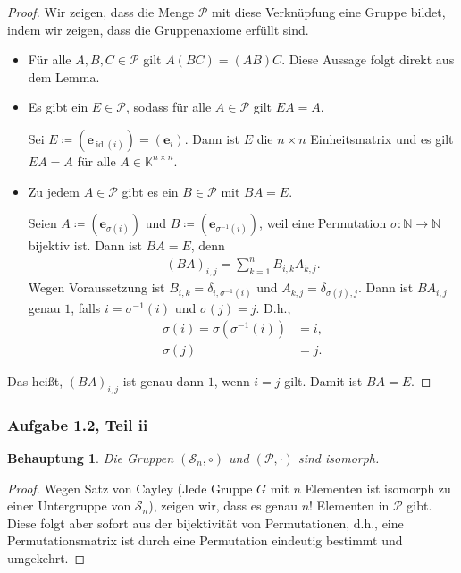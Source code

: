 \documentclass[draft,a5paper]{article}
\newtheorem*{beh}{Behauptung}
\DeclareMathOperator{\id}{id}
\begin{document}
\begin{proof}
  Wir zeigen, dass die Menge \(\mathcal{P} \) mit diese Verknüpfung eine Gruppe
  bildet, indem wir zeigen, dass die Gruppenaxiome erfüllt sind.

  \begin{itemize}
  \item Für alle \(A, B, C \in \mathcal{P} \) gilt \( A(BC) = (AB)C \).  Diese
    Aussage folgt direkt aus dem Lemma.
  \item Es gibt ein \( E \in \mathcal{P} \), sodass für alle \( A \in \mathcal{P} \) gilt \(
    EA = A\).

    Sei \( E \coloneq (\mathbf{e}_{\id (i)}) =
    (\mathbf{e}_{i}) \). Dann ist \(E\) die \(n \times n\)
    Einheitsmatrix und es gilt \(EA=A\) für alle \(A \in \mathbb{K}^{n
    \times n}\).
  \item Zu jedem \( A \in \mathcal{P} \) gibt es ein \( B \in \mathcal{P} \) mit \( B A = E \).

    Seien \( A \coloneq (\mathbf{e}_{\sigma(i)}) \) und \( B \coloneq
    (\mathbf{e}_{\sigma^{-1}(i)})\), weil eine Permutation \(\sigma\colon \mathbb{N} \to
    \mathbb{N} \) bijektiv ist. Dann ist \( B A = E\), denn
    \begin{align*}
      (BA)_{i,j}
      = \sum_{k=1}^{n}{B_{i,k}A_{k,j}}.
    \end{align*}
    Wegen Voraussetzung ist \(B_{i,k} = \delta_{i, \sigma^{-1}(i)}\) und \(A_{k,j} =
    \delta_{\sigma(j), j}\).  Dann ist \(BA_{i,j}\) genau \(1\), falls \(i =
    \sigma^{-1}(i)\) und \(\sigma(j) = j\).  D.h.,
    \begin{align*}
      \sigma(i) = \sigma(\sigma^{-1}(i)) &= i, \\
      \sigma(j) &= j.
    \end{align*}
  \end{itemize}
  Das heißt, \((BA)_{i,j}\) ist genau dann \(1\), wenn \(i = j\) gilt.
  Damit ist \(BA = E\).
\end{proof}

\subsubsection*{Aufgabe 1.2, Teil ii}

\begin{beh}
  Die Gruppen \((\mathcal{S}_{n}, \circ)\) und \((\mathcal{P}, \cdot)\) sind isomorph.
\end{beh}

\begin{proof}
  Wegen Satz von Cayley (Jede Gruppe \(G\) mit \(n\) Elementen ist
  isomorph zu einer Untergruppe von \(\mathcal{S}_{n}\)), zeigen wir, dass es
  genau \(n!\) Elementen in \(\mathcal{P} \) gibt.
  Diese folgt aber sofort aus der bijektivität von Permutationen,
  d.h., eine Permutationsmatrix ist durch eine Permutation eindeutig
  bestimmt und umgekehrt.
\end{proof}
\end{document}
